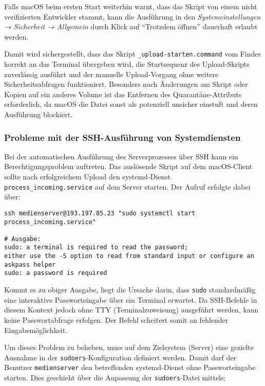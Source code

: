 \documentclass[12pt,a4paper]{report}
\begin{document}
    Falls macOS beim ersten Start weiterhin warnt, dass das Skript von einem nicht verifizierten Entwickler stammt,  
    kann die Ausführung in den \emph{Systemeinstellungen → Sicherheit → Allgemein} durch Klick auf 
    \enquote{Trotzdem öffnen} dauerhaft erlaubt werden.  

    Damit wird sichergestellt, dass das Skript \texttt{\_upload-starten.command} vom Finder korrekt an das Terminal übergeben wird, 
    die Startsequenz des Upload-Skripts zuverlässig ausführt und der manuelle Upload-Vorgang ohne weitere Sicherheitsabfragen funktioniert.  
    Besonders nach Änderungen am Skript oder Kopien auf ein anderes Volume ist das Entfernen des Quarantäne-Attributs erforderlich, 
    da macOS die Datei sonst als potenziell unsicher einstuft und deren Ausführung blockiert.

    \subsubsection*{Probleme mit der SSH-Ausführung von Systemdiensten}
    Bei der automatischen Ausführung des Serverprozesses über SSH kann ein Berechtigungsproblem auftreten.  
    Das auslösende Skript auf dem macOS-Client sollte nach erfolgreichem Upload den systemd-Dienst\\
    \texttt{process\_incoming.service} auf dem Server starten. Der Aufruf erfolgte dabei über:

    \begin{verbatim}
ssh medienserver@193.197.85.23 "sudo systemctl start process_incoming.service"

# Ausgabe:
sudo: a terminal is required to read the password;
either use the -S option to read from standard input or configure an askpass helper
sudo: a password is required
    \end{verbatim}

    Kommt es zu obiger Ausgabe, liegt die Ursache darin, dass \texttt{sudo} standardmäßig eine interaktive Passworteingabe über ein Terminal erwartet.  
    Da SSH-Befehle in diesem Kontext jedoch ohne TTY (Terminalzuweisung) ausgeführt werden, kann keine Passwortabfrage erfolgen.  
    Der Befehl scheitert somit an fehlender Eingabemöglichkeit.

    Um dieses Problem zu beheben, muss auf dem Zielsystem (Server) eine gezielte Ausnahme in der \texttt{sudoers}-Konfiguration definiert werden.  
    Damit darf der Benutzer \texttt{medienserver} den betreffenden systemd-Dienst ohne Passworteingabe starten.  
    Dies geschieht über die Anpassung der \texttt{sudoers}-Datei mittels:
\end{document}
